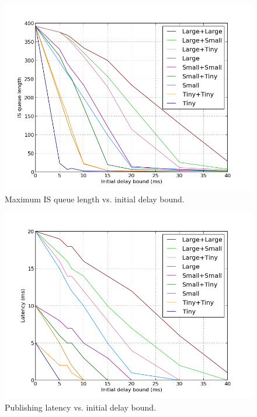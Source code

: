 \begin{figure}[ht]
\centering
\includegraphics[scale=0.5]{Images/one_slot_sim_qlen.png}
\caption{Maximum IS queue length vs. initial delay bound.}
\label{fig:one_slot_sim_qlen}
\end{figure}

\begin{figure}[ht]
\centering
\includegraphics[scale=0.5]{Images/one_slot_sim_latency.png}
\caption{Publishing latency vs. initial delay bound.}
\label{fig:one_slot_sim_latency}
\end{figure}

